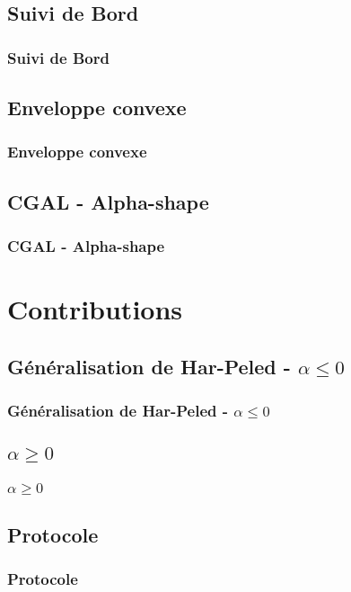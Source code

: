 \documentclass{beamer}
\begin{document}
\subsection{Suivi de Bord} 
\begin{frame}
\frametitle{Suivi de Bord}
\end{frame}

\subsection{Enveloppe convexe} 
\begin{frame}
\frametitle{Enveloppe convexe}
\end{frame}

\subsection{CGAL - Alpha-shape}  %
\begin{frame}
\frametitle{CGAL - Alpha-shape}
\end{frame}

\section{Contributions} 

\subsection{Généralisation de Har-Peled - $\alpha \leq 0$} 
\begin{frame}
\frametitle{Généralisation de Har-Peled - $\alpha \leq 0$}
\end{frame}

\subsection{$\alpha \geq 0$} 
\begin{frame}
\frametitle{$\alpha \geq 0$}
\end{frame}

\subsection{Protocole} 
\begin{frame}
\frametitle{Protocole}
\end{frame}

\end{document}
